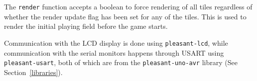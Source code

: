 The \texttt{render} function accepts a boolean to force rendering of all
tiles regardless of whether the render update flag has been set for any of the
tiles. This is used to render the initial playing field before the game starts.

Communication with the LCD display is done using \texttt{pleasant-lcd}, while
communication with the serial monitors happens through USART using
\texttt{pleasant-usart}, both of which are from the \texttt{pleasant-uno-avr}
library (See Section~\ref{libraries}).

